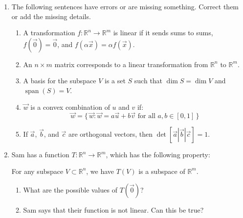 \documentclass[red]{tutorial}
\newcommand{\R}{\mathbb{R}}
\DeclareMathOperator{\Span} {span}
\theoremstyle{definition}
\theoremstyle{theorem}
\begin{document}
\begin{tutorial}
  \begin{enumerate}
    \item The following sentences have errors or are missing 
      something. Correct
      them or add the missing details.
      \begin{enumerate}
        \item
          A transformation $f\colon\R^n\to \R^m$ is linear if 
          it sends sums to sums, $f(\vec0) = \vec0$, and 
          $f(\alpha \vec x) = \alpha f(\vec x)$.
        \item
          An $n\times m$ matrix corresponds to a linear 
          transformation from $\R^n$
          to $\R^m$.
        \item %
          A basis for the subspace $V$ is a set $S$ 
          such that $\dim S = \dim V$ and $\Span(S) = V$.
        \item
          $\vec w$ is a convex combination of $u$ and $v$ if:
          \begin{equation*}
            \vec w =
            \bigl\{\,\vec w:\vec w = a\vec u %
              +b\vec v \text{ for all } a,b\in [0,1]\,
            \bigr\}
          \end{equation*}
        \item %
          If $\vec a$, $\vec b$, and $\vec c$ are orthogonal 
          vectors, then $\det \left[\vec a|\vec b|\vec c\right] = 1$.
      \end{enumerate}
    \item %
      Sam has a function $T\colon\R^n\to \R^m$, which has the following
      property:
      \begin{center}
        For any subspace $V\subset \R^n$, we have $T(V)$ is a subspace of $\R^m$.
      \end{center}
      \begin{enumerate}
        \item What are the possible values of $T(\vec0)$?
        \item Sam says that their function is not linear. Can this be true?
      \end{enumerate}

\end{enumerate}
\end{tutorial}
\end{document}
